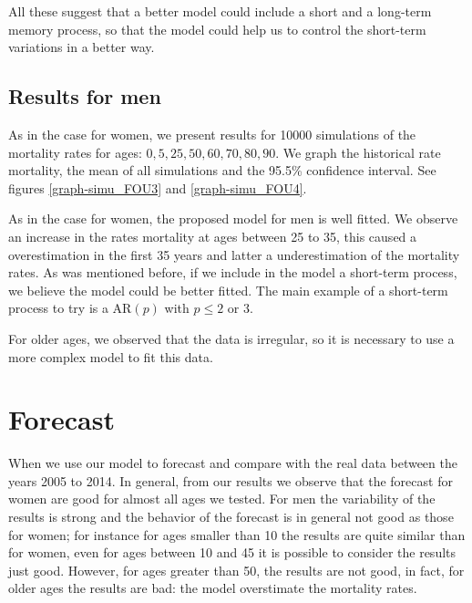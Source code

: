 \documentclass[smallextended]{svjour3}
\begin{document}
        All these suggest that a better model could include a short and a 
    long-term memory process, so that the model could help us to control the 
    short-term variations in a better way.

    \subsection{Results for men}\label{re-men}

        As in the case for women, we present results for 10000 simulations of 
    the mortality rates for ages: 
    $
        \num{0}, 
        \num{5}, 
        \num{25}, 
        \num{50}, 
        \num{60}, 
        \num{70}, 
        \num{80}, 
        \num{90}
    $.
    We graph the historical rate mortality, the mean of all simulations and the
    \num{95.5}\% confidence interval. See figures \ref{graph-simu_FOU3} and
    \ref{graph-simu_FOU4}.

        As in the case for women, the proposed model for men is well fitted.
    We observe an increase in the rates mortality at ages between 25 to 35, this
    caused a overestimation in the first 35 years and latter a underestimation
    of the mortality rates. As was mentioned before, if we include in the model 
    a short-term process,  we believe the model could be better fitted. The main
    example  of a short-term process to try is a AR$(p)$ with $p\le 2$ or $3$.

        For older ages, we observed that the data is irregular, so it is 
    necessary to use a more complex model to
    fit this data.

\section{Forecast}

        When we use our model to forecast and compare with the real data 
    between the years \num{2005} to \num{2014}. In general, from our results we 
    observe that the forecast for women are good for almost all ages we tested. 
    For men the variability of the results is strong and the behavior of the
    forecast is in general not good as those for women; for instance for ages 
    smaller than 10 the results are quite similar than for women, even for ages 
    between \num{10} and \num{45} it is possible to
    consider the results just good. However, for ages greater than \num{50}, 
    the results are not good, in fact, for older ages the results are bad: the 
    model overstimate the mortality rates.
\end{document}
